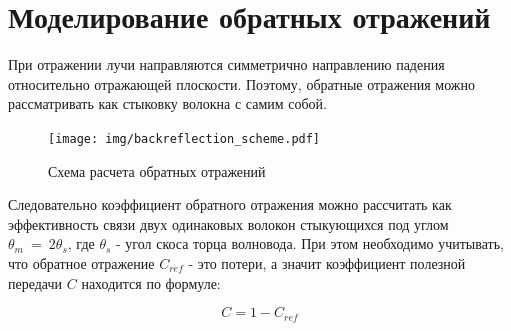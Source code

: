 \section{Моделирование обратных отражений}
\label{backreflection_method}
При отражении лучи направляются симметрично направлению падения относительно отражающей плоскости. Поэтому, обратные отражения можно рассматривать как стыковку волокна с самим собой.

\begin{figure}[h!]
	\texttt{[image: img/backreflection\_scheme.pdf]}
	\caption{Схема расчета обратных отражений}
\end{figure}

Следовательно коэффициент обратного отражения можно рассчитать как эффективность связи двух одинаковых волокон стыкующихся под углом $\theta_m~=~2\theta_s$, где $\theta_s$ - угол скоса торца волновода. При этом необходимо учитывать, что обратное отражение $C_{ref}$ - это потери, а значит коэффициент полезной передачи $C$ находится по формуле:

\begin{equation}
	C = 1 - C_{ref}
\end{equation}
